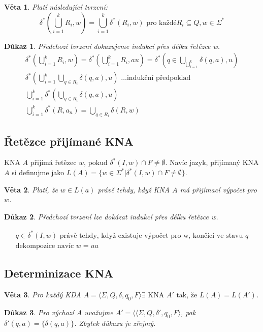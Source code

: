 \documentclass[10pt, a4paper, titlepage]{article}
\theoremstyle{note}
\newtheorem{veta}{\textbf{Věta}}
\newtheorem{dukaz}{\textbf{Důkaz}}
\begin{document}
\begin{veta}
Platí následující tvrzení:
$$
\delta^{*}(\bigcup\limits_{i=1}^{k} R_{i},w) = \bigcup\limits_{i=1}^{k} \delta^{*}(R_{i},w) \text{ pro každé} R_{i} \subseteq Q, w \in \Sigma^{*}
$$
\end{veta}
\begin{dukaz}
Předchozí tvrzení dokazujeme indukcí přes délku řetězce w.
\begin{gather*}
\delta^{*}(\bigcup\limits_{i=1}^{k}R_{i},w) = \delta^{*}(\bigcup\limits_{i=1}^{k}R_{i},au) = \delta^{*}(q \in \bigcup\limits_{\bigcup_{i=1}^{k}} \delta(q, a), u) \\
\delta^{*}(\bigcup\limits_{i=1}^{k}\bigcup\limits_{q \in R_{i}} \delta(q,a),u) \text{ \ldots indukční předpoklad} \\
\bigcup\limits_{i=1}^{k} \delta^{*}(\bigcup\limits_{q \in R_{i}} \delta(q,a),u) \\
\bigcup\limits_{i=1}^{k} \delta^{*}(R,a_{n}) = \bigcup\limits_{q \in R_{i}} \delta(R,w)
\end{gather*}
\end{dukaz}

\subsection{Řetězce přijímané KNA}
KNA $A$ přijímá řetězec $w$, pokud $\delta^{*}(I,w) \cap F \neq \emptyset$.
Navíc jazyk, přijímaný KNA $A$ si definujme jako $L(A) = \lbrace w \in \Sigma^{*} | \delta^{*}(I,w) \cap F \neq \emptyset \rbrace$.

\begin{veta}
Platí, že $w \in L(a)$ právě tehdy, když KNA $A$ má přijímací výpočet pro $w$.
\end{veta}
\begin{dukaz}
Předchozí tvrzení lze dokázat indukcí přes délku řetězce w.

\begin{gather*}
q \in \delta^{*}(I,w) \text{ právě tehdy, když existuje výpočet pro w, končící ve stavu } q \\
\text{dekompozice navíc } w = ua
\end{gather*}
\end{dukaz}

\subsection{Determinizace KNA}
\begin{veta}
Pro každý KDA $A=\langle \Sigma, Q, \delta, q_{0}, F \rangle \exists \text{ KNA } A' \text{ tak, že } L(A)=L(A') $.
\end{veta}
\begin{dukaz}
Pro výchozí $A$ uvažujme $A'=\langle \langle \Sigma, Q, \delta', q_{0}, F \rangle$, pak $\delta'(q,a) = \lbrace \delta(q,a) \rbrace$. Zbytek důkazu je zřejmý.
\end{dukaz}
\end{document}
